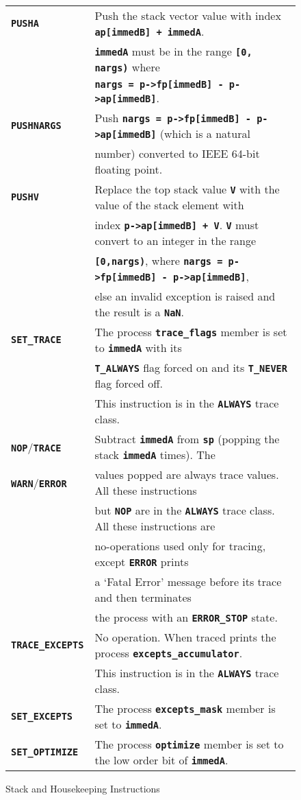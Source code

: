 \documentclass[12pt]{article}
\makeatletter
\newcommand{\TT}[1]{{\tt \bfseries #1}}
\newcommand{\ttkey}[1]{\TT{#1}\index{#1@{\tt #1}}}
\newlength{\figurewidth}
\newenvironment{boxedfigure}[1][!btp]%
	{\begin{figure*}[#1]
	 \begin{lrbox}{\figurebox}
	 \begin{minipage}{\figurewidth}

	 \vspace*{1ex}}%
	{
	 \vspace*{1ex}

	 \end{minipage}
	 \end{lrbox}

	 \centering
	 \fbox{\hspace*{0.1in}\usebox{\figurebox}\hspace*{0.1in}}
	 \end{figure*}}
\makeatother
\begin{document}
\begin{boxedfigure}

\begin{center}
\small
\begin{tabular}{|l|l|}
\hline
\ttkey{PUSHA}
    & Push the stack vector value with index \TT{ap[immedB] + immedA}. \\
    & \TT{immedA} must be in the range \TT{[0, nargs)} where \\
    & \TT{nargs = p->fp[immedB] - p->ap[immedB]}.
\\\hline
\ttkey{PUSHNARGS}
    & Push \TT{nargs = p->fp[immedB] - p->ap[immedB]}
        (which is a natural \\
    & number) converted to IEEE 64-bit floating point.
\\\hline
\ttkey{PUSHV}
    & Replace the top stack value \TT{V} with the value of the stack element
      with \\
    & index \TT{p->ap[immedB] + V}. \TT{V} must convert to an integer
      in the range \\
    & \TT{[0,nargs)}, where \TT{nargs = p->fp[immedB] - p->ap[immedB]}, \\
    & else an invalid exception is raised and the result is a \TT{NaN}.
\\\hline
\ttkey{SET\_TRACE}
    & The process \TT{trace\_flags} member is set to \TT{immedA} with its\\
    & \TT{T\_ALWAYS} flag forced on and its \TT{T\_NEVER} flag forced off. \\
    & This instruction is in the \TT{ALWAYS} trace class.
\\\hline
\ttkey{NOP}/\ttkey{TRACE}
    & Subtract \TT{immedA} from
      \TT{sp} (popping the stack \TT{immedA} times).  The \\
\ttkey{WARN}/\ttkey{ERROR}
    & values popped are always trace values.  All these instructions \\
    & but \TT{NOP} are in the \TT{ALWAYS} trace class.  All these instructions
      are \\
    & no-operations used only for tracing, except \TT{ERROR} prints \\
    & a `Fatal Error' message before its trace and then terminates \\
    & the process with an \TT{ERROR\_STOP} state.
\\\hline
\ttkey{TRACE\_EXCEPTS}
    & No operation.  When traced prints the process
      \TT{excepts\_accumulator}.  \\
    & This instruction is in the \TT{ALWAYS} trace class.
\\\hline
\ttkey{SET\_EXCEPTS}
    & The process \TT{excepts\_mask} member is set to \TT{immedA}.
\\\hline
\ttkey{SET\_OPTIMIZE}
    & The process \TT{optimize} member is set to the low order bit
      of \TT{immedA}.
\\\hline
\end{tabular}
\end{center}
\vspace*{-3ex}
\caption{Stack and Housekeeping Instructions}
\label{STACK-AND-HOUSEKEEPING-INSTRUCTIONS}
\end{boxedfigure}
\end{document}
